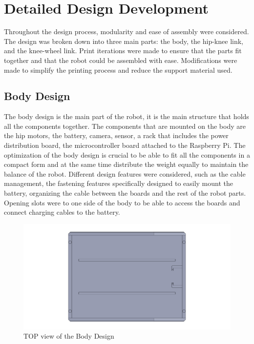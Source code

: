 \newpage
\section{Detailed Design Development}
Throughout the design process, modularity and ease of assembly were considered.
The design was broken down into three main parts: the body, the hip-knee link, and the knee-wheel link.
Print iterations were made to ensure that the parts fit together and that the robot could be assembled with ease. Modifications were made to simplify the printing process and reduce the support material used.


\subsection{Body Design}
The body design is the main part of the robot, it is the main structure that holds all the components together.
The components that are mounted on the body are the hip motors, the battery, camera, sensor, a rack that includes the power distribution board, the microcontroller board attached to the Raspberry Pi. The optimization of the body design is crucial to be able to fit all the components in a compact form and at the same time distribute the weight equally to maintain the balance of the robot.
Different design features were considered, such as the cable management, the fastening features specifically designed to easily mount the battery, organizing the cable between the boards and the rest of the robot parts.
Opening slots were to one side of the body to be able to access the boards and connect charging cables to the battery.
\begin{figure}[h]
	\centering
	\includegraphics[width=1\linewidth]{Body_Design_1}
	\caption[TOP view of the Body Design]{TOP view of the Body Design}
	\label{fig:bodydesign1}
\end{figure}
